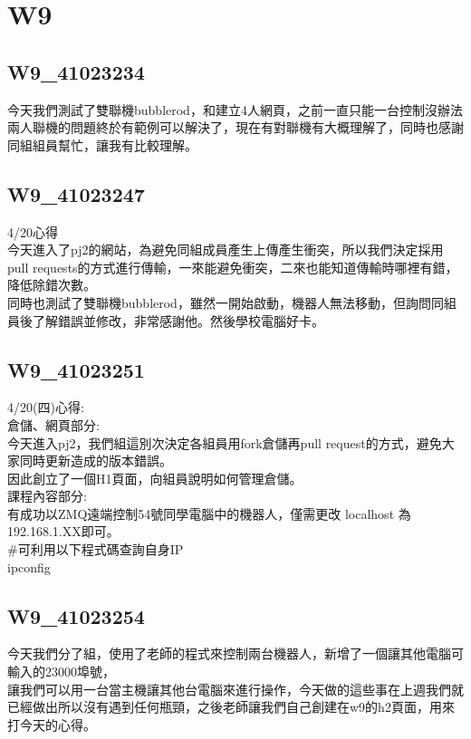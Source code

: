 \chapter{W9}
\section{W9_41023234}
 今天我們測試了雙聯機bubblerod，和建立4人網頁，之前一直只能一台控制沒辦法兩人聯機的問題終於有範例可以解決了，現在有對聯機有大概理解了，同時也感謝同組組員幫忙，讓我有比較理解。\\[6pt]


\section{W9_41023247}
 4/20心得\\

今天進入了pj2的網站，為避免同組成員產生上傳產生衝突，所以我們決定採用pull requests的方式進行傳輸，一來能避免衝突，二來也能知道傳輸時哪裡有錯，降低除錯次數。\\
同時也測試了雙聯機bubblerod，雖然一開始啟動，機器人無法移動，但詢問同組員後了解錯誤並修改，非常感謝他。然後學校電腦好卡。\\

\section{W9_41023251}
 4/20(四)心得:\\

倉儲、網頁部分:\\

今天進入pj2，我們組這別次決定各組員用fork倉儲再pull request的方式，避免大家同時更新造成的版本錯誤。\\
因此創立了一個H1頁面，向組員說明如何管理倉儲。\\


課程內容部分:\\

有成功以ZMQ遠端控制54號同學電腦中的機器人，僅需更改 localhost 為192.168.1.XX即可。\\
#可利用以下程式碼查詢自身IP\\
	
ipconfig\\

\section{W9_41023254}
今天我們分了組，使用了老師的程式來控制兩台機器人，新增了一個讓其他電腦可輸入的23000埠號，\\
讓我們可以用一台當主機讓其他台電腦來進行操作，今天做的這些事在上週我們就已經做出所以沒有遇到任何瓶頸，之後老師讓我們自己創建在w9的h2頁面，用來打今天的心得。\\

